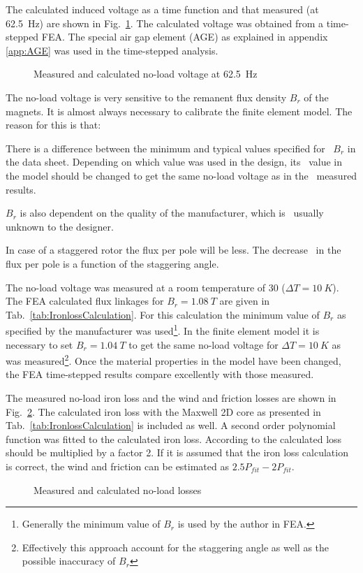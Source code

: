 The calculated induced voltage as a time function and that measured (at \SI{62.5}{Hz}) are shown in Fig.~\ref{fig:U1_time}. The calculated voltage was obtained from a time-stepped FEA. The special air gap element (AGE) as explained in appendix \ref{app:AGE} was used in the time-stepped analysis.    
\begin{figure}[htbp]
  \centering
    
  \caption{Measured and calculated no-load voltage at \SI{62.5}{Hz}}
  \label{fig:U1_time}
\end{figure}

The no-load voltage is very sensitive to the remanent flux density $B_{r}$ of the magnets. It is almost always necessary to calibrate the finite element model. The reason for this is that:
\begin{itemize*}
  \item There is a difference between the minimum and typical values specified for~%
  $B_{r}$ in the data sheet. Depending on which value was used in the design, its~%
  value in the model should be changed to get the same no-load voltage as in the~%
  measured results.
  \item $B_{r}$ is also dependent on the quality of the manufacturer, which is~%
  usually unknown to the designer.
  \item In case of a staggered rotor the flux per pole will be less. The decrease~%
  in the flux per pole is a function of the staggering angle.
\end{itemize*}
The no-load voltage was measured at a room temperature of \SI{30}{\degC} ($\Delta T=\SI{10}{K}$). The FEA calculated flux linkages for $B_r=\SI{1.08}{T}$ are given in Tab.~\ref{tab:IronlossCalculation}. For this calculation the minimum value of $B_r$ as specified by the manufacturer was used\footnote{Generally the minimum value of $B_r$ is used by the author in FEA.}. In the finite element model it is necessary to set $B_r=\SI{1.04}{T}$ to get the same no-load voltage for $\Delta T=\SI{10}{K}$ as was measured\footnote{Effectively this approach account for the staggering angle as well as the possible inaccuracy of $B_r$}. Once the material properties in the model have been changed, the FEA time-stepped results compare excellently with those measured.

The measured no-load iron loss and the wind and friction losses are shown in Fig.~\ref{fig:pfe_calc_meas}. The calculated iron loss with the Maxwell 2D core as presented in Tab.~\ref{tab:IronlossCalculation} is included as well. A second order polynomial function was fitted to the calculated iron loss. According to \cite{Germishuizen2008} the calculated loss should be multiplied by a factor 2. If it is assumed that the iron loss calculation is correct, the wind and friction can be estimated as $2.5P_{fit}-2P_{fit}$.
\begin{figure}[htbp]
  \centering
    
  \caption{Measured and calculated no-load losses}
  \label{fig:pfe_calc_meas}
\end{figure}

